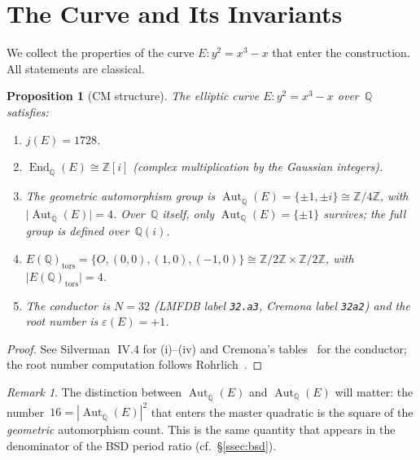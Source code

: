 \documentclass[12pt,reqno]{amsart}
\newtheorem{proposition}[theorem]{Proposition}
\theoremstyle{definition}
\theoremstyle{remark}
\newtheorem{remark}[theorem]{Remark}
\newcommand{\ZZ}{\mathbb{Z}}
\newcommand{\QQ}{\mathbb{Q}}
\newcommand{\Qbar}{\overline{\QQ}}
\newcommand{\Aut}{\operatorname{Aut}}
\newcommand{\End}{\operatorname{End}}
\newcommand{\abs}[1]{\lvert #1 \rvert}
\begin{document}
\section{The Curve and Its Invariants}\label{sec:prereq}

We collect the properties of the curve $E\colon y^{2}=x^{3}-x$ that enter the
construction.  All statements are classical.

\begin{proposition}[CM structure]\label{prop:CM}
The elliptic curve $E\colon y^{2}=x^{3}-x$ over~$\QQ$ satisfies:
\begin{enumerate}[label=\textup{(\roman*)}]
  \item $j(E) = 1728$.
  \item $\End_{\Qbar}(E) \cong \ZZ[i]$
    \textup{(}complex multiplication by the Gaussian integers\textup{)}.
  \item The \emph{geometric} automorphism group is
    $\Aut_{\Qbar}(E) = \{\pm 1, \pm i\} \cong \ZZ/4\ZZ$,
    with $\abs{\Aut_{\Qbar}(E)} = 4$.
    Over~$\QQ$ itself, only $\Aut_{\QQ}(E)=\{\pm 1\}$ survives; the full
    group is defined over~$\QQ(i)$.
  \item $E(\QQ)_{\mathrm{tors}} =
    \{O,(0,0),(1,0),(-1,0)\} \cong \ZZ/2\ZZ \times \ZZ/2\ZZ$,
    with $\abs{E(\QQ)_{\mathrm{tors}}} = 4$.
  \item The conductor is $N=32$ \textup{(}LMFDB label \texttt{32.a3},
    Cremona label \texttt{32a2}\textup{)}
    and the root number is $\varepsilon(E) = +1$.
\end{enumerate}
\end{proposition}

\begin{proof}
See Silverman~\cite{Silverman}\,IV.4 for (i)--(iv) and Cremona's
tables~\cite{Cremona} for the conductor; the root number computation
follows Rohrlich~\cite{Rohrlich}.
\end{proof}

\begin{remark}\label{rem:aut-basefield}
The distinction between $\Aut_{\Qbar}(E)$ and $\Aut_{\QQ}(E)$ will matter:
the number~$16 = {|\Aut_{\Qbar}(E)|}^{2}$ that enters the master quadratic
is the square of the \emph{geometric} automorphism count.  This is the same
quantity that appears in the denominator of the BSD period ratio
(cf.~\S\ref{ssec:bsd}).
\end{remark}
\end{document}

